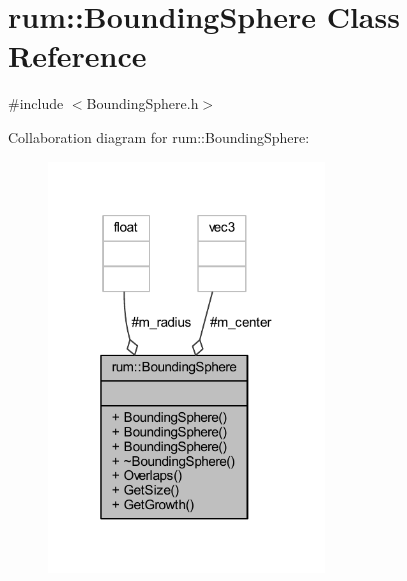 \hypertarget{classrum_1_1_bounding_sphere}{}\section{rum\+:\+:Bounding\+Sphere Class Reference}
\label{classrum_1_1_bounding_sphere}


{\ttfamily \#include $<$Bounding\+Sphere.\+h$>$}



Collaboration diagram for rum\+:\+:Bounding\+Sphere\+:\nopagebreak
\begin{figure}[H]
\begin{center}
\leavevmode
\includegraphics[width=208pt]{classrum_1_1_bounding_sphere__coll__graph}
\end{center}
\end{figure}
